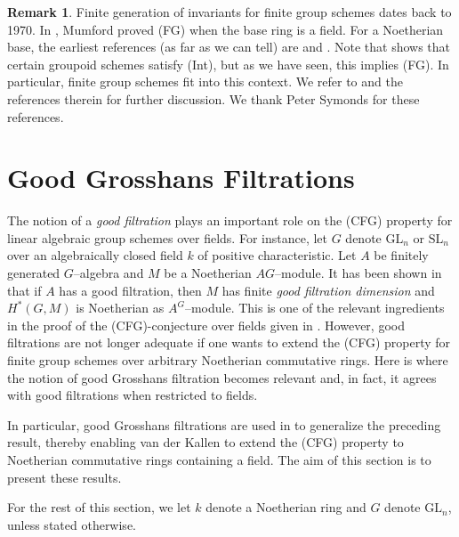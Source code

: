 \documentclass{article}
\theoremstyle{plain}
\theoremstyle{definition}
\newtheorem{Rem}[Th]{Remark}
\newcommand{\GL}{\mathrm{GL}}
\begin{document}
\begin{Rem}\label{rem: discussion on fg for finite groups}
    Finite generation of invariants for finite group schemes dates back to 1970. In \cite[Sec. 12, Theorem 1]{Mum70}, Mumford proved (FG) when the base ring is a field. For a Noetherian base, the earliest references (as far as we can tell) are \cite[Ch. 3, Sec. 2, no 6, Corollary]{DG70} and \cite[Exp. V, Theorem 4.1]{SGA3I}. Note that \cite[Exp. V, Theorem 4.1]{SGA3I} shows that certain groupoid schemes satisfy (Int), but as we have seen, this implies (FG). In particular, finite group schemes fit into this context. We refer to \cite[Theorem 20]{van2021reductivity} and the references therein for further discussion. We thank Peter Symonds for these references.
\end{Rem}

\pagebreak


\section{Good Grosshans Filtrations}\label{section:GrosshansFiltrations}

The notion of a \textit{good filtration} plays an important role on the (CFG) property for linear algebraic group schemes over fields. For instance, let $G$ denote  $\GL_n$ or $\mathrm{SL}_n$ over an algebraically closed field $k$ of positive characteristic. Let $A$ be finitely generated $G$--algebra and $M$ be a Noetherian $AG$--module. It has been shown in \cite[Theorem 1.1]{svdK09} that if $A$ has a good filtration, then $M$ has finite \textit{good filtration dimension} and $H^\ast(G,M)$ is Noetherian as $A^G$--module. This is one of the relevant ingredients in the proof of the (CFG)-conjecture over fields given in \cite{TvdK10}. However, good filtrations are not longer  adequate if one wants to extend the (CFG) property for finite  group schemes over arbitrary Noetherian commutative rings. Here is where the notion of good Grosshans filtration becomes relevant and, in fact, it agrees with good filtrations when restricted to fields. 

In particular, good Grosshans filtrations are used in \cite{vdK15} to generalize the preceding result, thereby enabling van der Kallen to extend the (CFG) property to Noetherian commutative rings containing a field. The aim of this section is to present these results.


For the rest of this section, we let $k$ denote a Noetherian ring and $G$ denote $\GL_n$, unless stated otherwise. 
\end{document}
